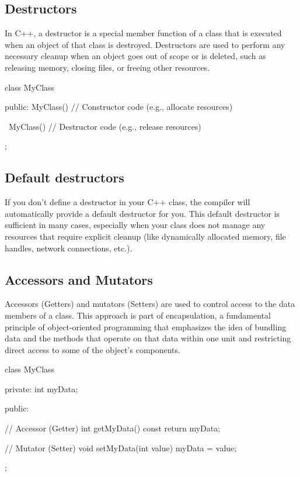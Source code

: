 \documentclass{report}
\begin{document}
    \subsection{Destructors}
    \bigbreak \noindent 
    \begin{concept}
        In C++, a destructor is a special member function of a class that is executed when an object of that class is destroyed. Destructors are used to perform any necessary cleanup when an object goes out of scope or is deleted, such as releasing memory, closing files, or freeing other resources.
    \end{concept}
    \bigbreak \noindent 
    \begin{cppcode}
class MyClass {
public:
    MyClass() {
        // Constructor code (e.g., allocate resources)
    }

    ~MyClass() {
        // Destructor code (e.g., release resources)
    }
};
    \end{cppcode}

    \bigbreak \noindent 
    \subsection{Default destructors}
    \bigbreak \noindent 
    \begin{concept}
        If you don't define a destructor in your C++ class, the compiler will automatically provide a default destructor for you. This default destructor is sufficient in many cases, especially when your class does not manage any resources that require explicit cleanup (like dynamically allocated memory, file handles, network connections, etc.).
    \end{concept}
    

    \bigbreak \noindent 
    \subsection{Accessors and Mutators}
    \bigbreak \noindent 
    \begin{concept}
       Accessors (Getters) and mutators (Setters) are used to control access to the data members of a class. This approach is part of encapsulation, a fundamental principle of object-oriented programming that emphasizes the idea of bundling data and the methods that operate on that data within one unit and restricting direct access to some of the object's components. 
    \end{concept}
    \bigbreak \noindent 
    \begin{cppcode}
class MyClass {
private:
    int myData;

public:

    // Accessor (Getter)
    int getMyData() const {
        return myData;
    }

    // Mutator (Setter)
    void setMyData(int value) {
        myData = value;
    }
};
    \end{cppcode}
    
\end{document}

